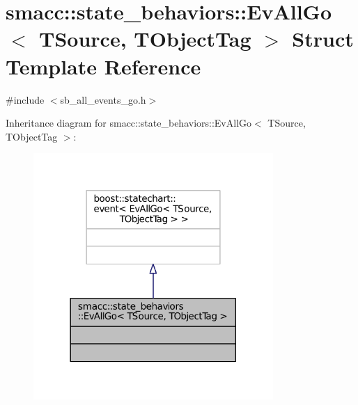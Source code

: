 \hypertarget{structsmacc_1_1state__behaviors_1_1EvAllGo}{}\section{smacc\+:\+:state\+\_\+behaviors\+:\+:Ev\+All\+Go$<$ T\+Source, T\+Object\+Tag $>$ Struct Template Reference}
\label{structsmacc_1_1state__behaviors_1_1EvAllGo}


{\ttfamily \#include $<$sb\+\_\+all\+\_\+events\+\_\+go.\+h$>$}



Inheritance diagram for smacc\+:\+:state\+\_\+behaviors\+:\+:Ev\+All\+Go$<$ T\+Source, T\+Object\+Tag $>$\+:
\nopagebreak
\begin{figure}[H]
\begin{center}
\leavevmode
\includegraphics[width=258pt]{structsmacc_1_1state__behaviors_1_1EvAllGo__inherit__graph}
\end{center}
\end{figure}


